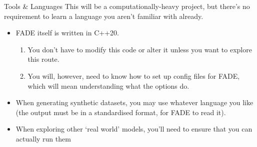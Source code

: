 \documentclass[aspectratio=169]{beamer}
\begin{document}
		\begin{frame}{Tools \& Languages}
			This will be a computationally-heavy project, but there's no requirement to learn a language you aren't familiar with already.
			\begin{itemize}
				\item FADE itself is written in C++20.
				      \begin{enumerate}
					      \item You don't have to modify this code or alter it unless you want to explore this route.
					      \item You will, however, need to know how to set up config files for FADE, which will mean understanding what the options do.
				      \end{enumerate}
				\item When generating synthetic datasets, you may use whatever language you like (the output must be in a standardised format, for FADE to read it).
				\item When exploring other `real world' models, you'll need to ensure that you can actually run them
			\end{itemize}
		\end{frame}
\end{document}
